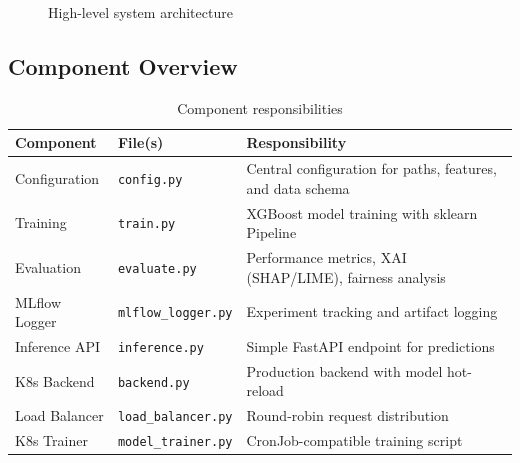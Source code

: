 \documentclass[11pt,a4paper]{article}
\begin{document}
\begin{figure}[H]
\caption{High-level system architecture}
\label{fig:high-level-arch}
\end{figure}

\subsection{Component Overview}

\begin{table}[H]
\centering
\small
\begin{tabular}{@{}p{3cm}p{3cm}p{7cm}@{}}
\toprule
\textbf{Component} & \textbf{File(s)} & \textbf{Responsibility} \\
\midrule
Configuration & \texttt{config.py} & Central configuration for paths, features, and data schema \\
Training & \texttt{train.py} & XGBoost model training with sklearn Pipeline \\
Evaluation & \texttt{evaluate.py} & Performance metrics, XAI (SHAP/LIME), fairness analysis \\
MLflow Logger & \texttt{mlflow\_logger.py} & Experiment tracking and artifact logging \\
Inference API & \texttt{inference.py} & Simple FastAPI endpoint for predictions \\
K8s Backend & \texttt{backend.py} & Production backend with model hot-reload \\
Load Balancer & \texttt{load\_balancer.py} & Round-robin request distribution \\
K8s Trainer & \texttt{model\_trainer.py} & CronJob-compatible training script \\
\bottomrule
\end{tabular}
\caption{Component responsibilities}
\end{table}
\end{document}
